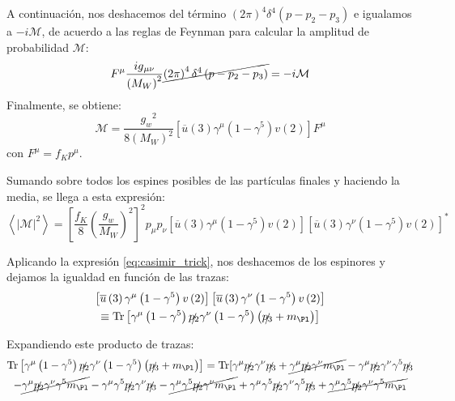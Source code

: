 A continuación, nos deshacemos del término $\left( 2\pi \right) ^{4}\delta ^{4}\left(p-p_{2}-p_{3}\right)$ e igualamos a $-i\mathcal{M}$, de acuerdo a las reglas de Feynman para calcular la amplitud de probabilidad $\mathcal{M}$:
\begin{equation}
[\overline{u}\left( 3\right) \left( \dfrac{-ig_w}{2\sqrt{2}}\right) ^{2}\gamma ^{\mu }\left( 1-\gamma ^{5}\right) v\left( 2\right)]F^{\mu} \dfrac{ig{_{\mu \nu}}}{\left( M_W\right)^{2}}\cancel{\left( 2\pi \right) ^{4}\delta ^{4}\left(p-p_{2}-p_{3}\right)}=-i\mathcal{M}
\end{equation}
Finalmente, se obtiene:
\begin{equation}
\mathcal{M} =\dfrac{{g_{w}}^2}{8\left( M_W\right)^{2}}\left[ \overline{u}\left(3\right) \gamma^{\mu}\left( 1-\gamma ^{5} \right) v\left( 2\right) \right] F^{\mu}
\end{equation}
con $F^{\mu}=f_K p^{\mu}$.

Sumando sobre todos los espines posibles de las partículas finales y haciendo la media, se llega a esta expresión:
\begin{equation}
\left\langle |\mathcal{M}|^{2}\right\rangle=\left[ \dfrac{f_{K}}{8}\left( \dfrac{g_w}{M_W}\right)^{2}\right]^{2} p_{\mu }p_{\nu} \left[ \overline{u}\left( 3\right)\gamma^{\mu}\left( 1-\gamma^{5}\right) v\left( 2\right) \right] \left[ \overline{u}\left( 3\right) \gamma^{\nu} \left( 1-\gamma^{5}\right) v\left( 2\right) \right] ^{\ast }
\end{equation}

Aplicando la expresión \ref{eq:casimir_trick}, nos deshacemos de los espinores y dejamos la igualdad en función de las trazas:
\begin{multline}
\left[ \overline{u}\left( 3\right)\gamma^{\mu}\left( 1-\gamma^{5}\right) v\left( 2\right) \right] \left[ \overline{u}\left( 3\right) \gamma^{\nu }\left( 1-\gamma^{5}\right) v\left( 2\right) \right] \\ \equiv \Tr \left[ \gamma^{\mu } \left(1 -\gamma ^{5}\right) \slashed{p_{2}}\gamma^{\nu }\left( 1-\gamma ^{5}\right) \left( \slashed{p_{3}}+m_{\Pl}\right) \right]
\end{multline}

Expandiendo este producto de trazas:
\begin{multline}
\Tr \left[ \gamma^{\mu } \left(1 -\gamma ^{5}\right) \slashed{p_{2}}\gamma^{\nu }\left( 1-\gamma ^{5}\right) \left( \slashed{p_{3}}+m_{\Pl}\right) \right] = \Tr[ \gamma ^{\mu }\slashed{p_{2}}\gamma ^{\nu }\slashed{p_{3}} + \cancel{\gamma ^{\mu }\slashed{p_{2}}\gamma ^{\nu }m_{\Pl}} -\gamma ^{\mu }\slashed{p_{2}}\gamma ^{\nu }\gamma ^{5}\slashed{p_{3}} \\ - \cancel{\gamma ^{\mu }\slashed{p_{2}}\gamma ^{\nu }\gamma ^{5}m_{\Pl}} -\gamma ^{\mu }\gamma ^{5}\slashed{p_{2}}\gamma ^{\nu }\slashed{p_{3}}- \cancel{\gamma ^{\mu }\gamma ^{5}\slashed{p_{2}}\gamma ^{\nu }m_{\Pl}} +\gamma ^{\mu }\gamma ^{5}\slashed{p_{2}}\gamma ^{\nu }\gamma ^{5}\slashed{p_{3}} + \cancel{\gamma ^{\mu }\gamma ^{5}\slashed{p_{2}}\gamma ^{\nu }\gamma ^{5}m_{\Pl}}
\end{multline}

